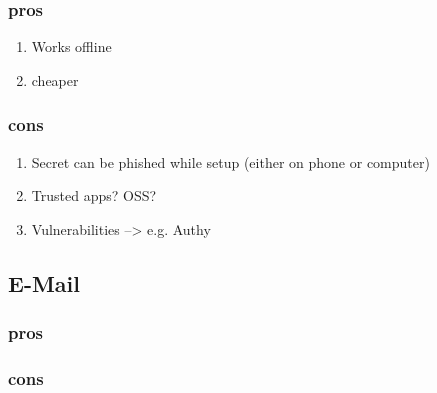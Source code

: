 \subsubsection{pros}

\begin{enumerate}
	\item Works offline
	\item cheaper
\end{enumerate}

\subsubsection{cons}

\begin{enumerate}
	\item Secret can be phished while setup (either on phone or computer)
	\item Trusted apps? OSS?
	\item Vulnerabilities --> e.g. Authy
\end{enumerate}

\subsection{E-Mail}

\subsubsection{pros}

\subsubsection{cons}